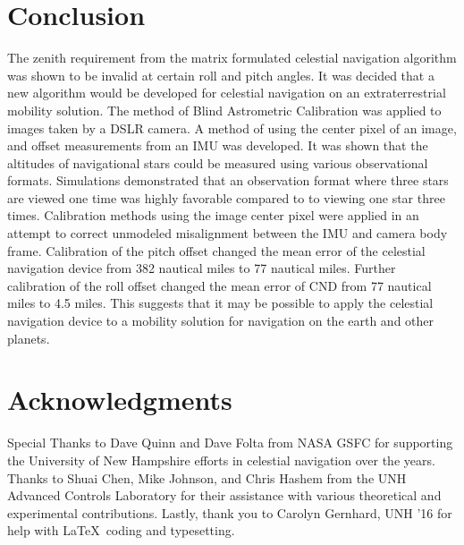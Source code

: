 \documentclass[]{aiaa-tc}%
\begin{document}
\section{Conclusion}  The zenith requirement from the matrix formulated celestial navigation algorithm was shown to be invalid at certain roll and pitch angles.  It was decided that a new algorithm would be developed for celestial navigation on an extraterrestrial mobility solution.  The method of Blind Astrometric Calibration was applied to images taken by a DSLR camera. A method of using the center pixel of an image, and offset measurements from an IMU was developed. It was shown that the altitudes of navigational stars could be measured using various observational formats.  Simulations demonstrated that an observation format where three stars are viewed one time was highly favorable compared to to viewing one star three times.  Calibration methods using the image center pixel were applied in an attempt to correct unmodeled misalignment between the IMU and camera body frame.  Calibration of the pitch offset changed the mean error of the celestial navigation device from 382 nautical miles to 77 nautical miles.  Further calibration of the roll offset changed the mean error of CND from 77 nautical miles to 4.5 miles.  This suggests that it may be possible to apply the celestial navigation device to a mobility solution for navigation on the earth and other planets.


\section*{Acknowledgments}
Special Thanks to Dave Quinn and Dave Folta from NASA GSFC for supporting the University of New Hampshire efforts in celestial navigation over the years.  Thanks to Shuai Chen, Mike Johnson, and Chris Hashem from the UNH Advanced Controls Laboratory for their assistance with various theoretical and experimental contributions.  Lastly, thank you to Carolyn Gernhard, UNH '16 for help with \LaTeX\ coding and typesetting.
\end{document}
